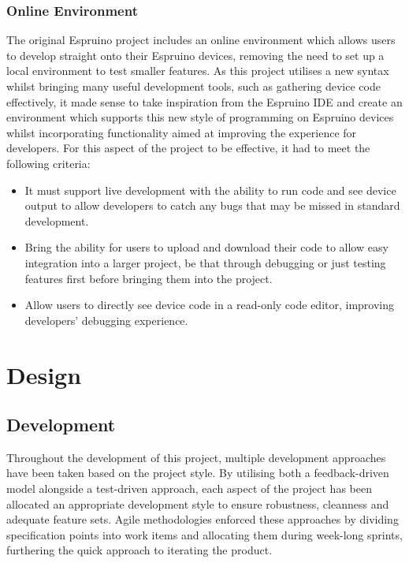 \documentclass{l4proj}
\begin{document}
\subsection{Online Environment}
\text The original Espruino project includes an online environment which allows users to develop straight onto their Espruino devices, removing the need to set up a local environment to test smaller features. As this project utilises a new syntax whilst bringing many useful development tools, such as gathering device code effectively, it made sense to take inspiration from the Espruino IDE and create an environment which supports this new style of programming on Espruino devices whilst incorporating functionality aimed at improving the experience for developers. For this aspect of the project to be effective, it had to meet the following criteria:
\\
\begin{itemize}
    \item It must support live development with the ability to run code and see device output to allow developers to catch any bugs that may be missed in standard development.
    \item Bring the ability for users to upload and download their code to allow easy integration into a larger project, be that through debugging or just testing features first before bringing them into the project.
    \item Allow users to directly see device code in a read-only code editor, improving developers' debugging experience.
\end{itemize}

\chapter{Design}

\section{Development}

Throughout the development of this project, multiple development approaches have been taken based on the project style. By utilising both a feedback-driven model alongside a test-driven approach, each aspect of the project has been allocated an appropriate development style to ensure robustness, cleanness and adequate feature sets. Agile methodologies enforced these approaches by dividing specification points into work items and allocating them during week-long sprints, furthering the quick approach to iterating the product.
\end{document}
